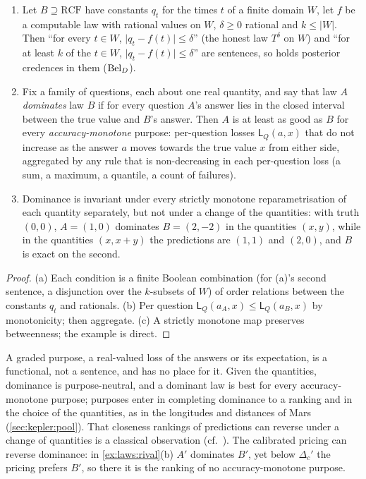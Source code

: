 \begin{proposition}\label{prop:laws:dominance}
\leavevmode
\begin{enumerate}[label=(\alph*),itemsep=1pt,topsep=2pt]
\item Let $B\supseteq\mathrm{RCF}$ have constants $q_t$ for the times $t$ of a finite domain $W$, let $f$ be a computable law with rational values on $W$, $\delta\ge0$ rational and $k\le\lvert W\rvert$. Then ``for every $t\in W$, $\lvert q_t-f(t)\rvert\le\delta$'' (the honest law $T^\delta$ on $W$) and ``for at least $k$ of the $t\in W$, $\lvert q_t-f(t)\rvert\le\delta$'' are sentences, so \SAIabbr holds posterior credences in them ($\mathrm{Bel}_D$).
\item Fix a family of questions, each about one real quantity, and say that law $A$ \emph{dominates} law $B$ if for every question $A$'s answer lies in the closed interval between the true value and $B$'s answer. Then $A$ is at least as good as $B$ for every \emph{accuracy-monotone} purpose: per-question losses $\mathsf L_Q(a,x)$ that do not increase as the answer $a$ moves towards the true value $x$ from either side, aggregated by any rule that is non-decreasing in each per-question loss (a sum, a maximum, a quantile, a count of failures).
\item Dominance is invariant under every strictly monotone reparametrisation of each quantity separately, but not under a change of the quantities: with truth $(0,0)$, $A=(1,0)$ dominates $B=(2,-2)$ in the quantities $(x,y)$, while in the quantities $(x,x+y)$ the predictions are $(1,1)$ and $(2,0)$, and $B$ is exact on the second.
\end{enumerate}
\end{proposition}

\begin{proof}
(a) Each condition is a finite Boolean combination (for (a)'s second sentence, a disjunction over the $k$-subsets of $W$) of order relations between the constants $q_t$ and rationals. (b) Per question $\mathsf L_Q(a_A,x)\le\mathsf L_Q(a_B,x)$ by monotonicity; then aggregate. (c) A strictly monotone map preserves betweenness; the example is direct.
\end{proof}

A graded purpose, a real-valued loss of the answers or its expectation, is a functional, not a sentence, and \SAIabbr has no place for it. Given the quantities, dominance is purpose-neutral, and a dominant law is best for every accuracy-monotone purpose; purposes enter in completing dominance to a ranking and in the choice of the quantities, as in the longitudes and distances of Mars (\cref{sec:kepler:pool}). That closeness rankings of predictions can reverse under a change of quantities is a classical observation (cf.\ \citealp{miller1975accuracy}). The calibrated pricing can reverse dominance: in \cref{ex:laws:rival}(b) $A'$ dominates $B'$, yet below $\Delta_c'$ the pricing prefers $B'$, so there it is the ranking of no accuracy-monotone purpose.

